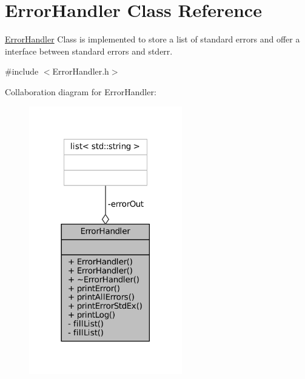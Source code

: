 \hypertarget{classErrorHandler}{}\section{Error\+Handler Class Reference}
\label{classErrorHandler}


\mbox{\hyperlink{classErrorHandler}{Error\+Handler}} Class is implemented to store a list of standard errors and offer a interface between standard errors and stderr.  




{\ttfamily \#include $<$Error\+Handler.\+h$>$}



Collaboration diagram for Error\+Handler\+:\nopagebreak
\begin{figure}[H]
\begin{center}
\leavevmode
\includegraphics[width=189pt]{classErrorHandler__coll__graph}
\end{center}
\end{figure}
